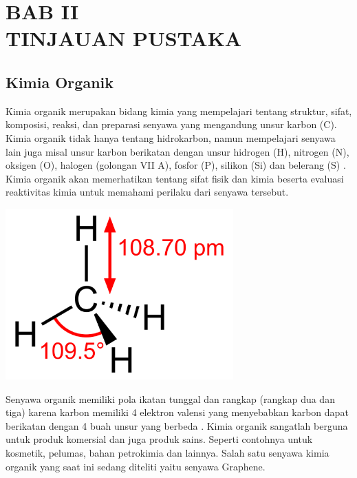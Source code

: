 \documentclass[12pt,a4paper]{report}
\begin{document}
\chapter*{BAB II \\ TINJAUAN PUSTAKA}
\setcounter{chapter}{2}
\setcounter{section}{0}
\setcounter{figure}{0}
\thispagestyle{myplain}
	\section{Kimia Organik}
	Kimia organik merupakan bidang kimia yang mempelajari tentang struktur, sifat, komposisi, reaksi, dan preparasi senyawa yang mengandung unsur karbon (C). Kimia organik tidak hanya tentang hidrokarbon, namun mempelajari senyawa lain juga misal unsur karbon berikatan dengan unsur hidrogen (H), nitrogen (N), oksigen (O), halogen (golongan VII A), fosfor (P), silikon (Si) dan belerang (S) \cite{ACS2020}. Kimia organik akan memerhatikan tentang sifat fisik dan kimia beserta evaluasi reaktivitas kimia untuk memahami perilaku dari senyawa tersebut.
	
	\begin{center}
		\includegraphics[width=8.75cm]{gambar/metana.png}
	\end{center}

	Senyawa organik memiliki pola ikatan tunggal dan rangkap (rangkap dua dan tiga) karena karbon memiliki 4 elektron valensi yang menyebabkan karbon dapat berikatan dengan 4 buah unsur yang berbeda \cite{Clayden2012}. Kimia organik sangatlah berguna untuk produk komersial dan juga produk sains. Seperti contohnya untuk kosmetik, pelumas, bahan petrokimia dan lainnya. Salah satu senyawa kimia organik yang saat ini sedang diteliti yaitu senyawa Graphene.
	
\end{document}
